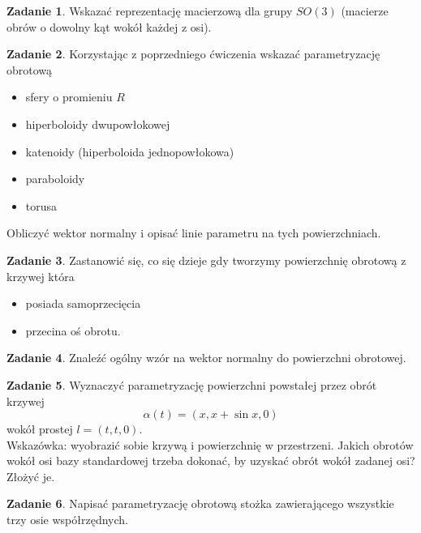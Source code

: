 \documentclass[a4paper,11pt]{article}
\theoremstyle{definition}\newtheorem{exercise}{Zadanie}
\theoremstyle{definition}\newtheorem{remark}{Uwaga}
\begin{document}
\begin{exercise}
Wskazać reprezentację macierzową dla grupy $SO(3)$ (macierze obr\'ow o dowolny 
kąt wok\'oł każdej z osi).
\end{exercise}

\begin{exercise}
Korzystając z poprzedniego ćwiczenia wskazać parametryzację obrotową 
\begin{itemize}
 \item sfery o promieniu $R$
 \item hiperboloidy dwupowłokowej
 \item katenoidy (hiperboloida jednopowłokowa)
 \item paraboloidy
\item torusa
 \end{itemize}
Obliczyć wektor normalny i opisać linie parametru na tych powierzchniach.
\end{exercise}

\begin{exercise}
Zastanowić się, co się dzieje gdy tworzymy powierzchnię obrotową z 
krzywej kt\'ora 
\begin{itemize}
 \item posiada samoprzecięcia
 \item przecina oś obrotu.
\end{itemize}

\end{exercise}

\begin{exercise}
 Znaleźć og\'olny wz\'or na wektor normalny do powierzchni obrotowej.
\end{exercise}

\begin{exercise}
Wyznaczyć parametryzację powierzchni powstałej przez obrót krzywej 
\[\alpha(t)=(x,x+\sin{x},0)\] wokół prostej $l=(t,t,0)$.\\[0.1in]
\small{Wskazówka: wyobrazić sobie krzywą i powierzchnię w przestrzeni. Jakich 
obrotów wokół osi bazy standardowej trzeba dokonać, by uzyskać obrót wokół 
zadanej osi? Złożyć je.}
\end{exercise}

\begin{exercise}
 Napisać parametryzację obrotową stożka zawierającego wszystkie trzy osie 
wsp\'ołrzędnych.
\end{exercise}

\end{document}
